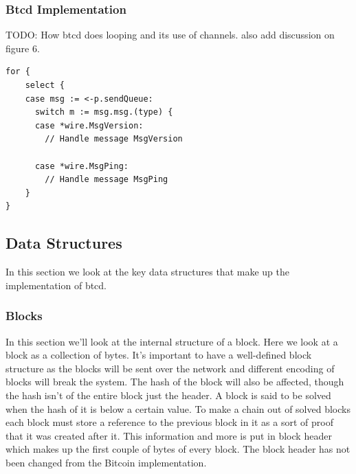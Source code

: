 \documentclass[12pt]{article}
\begin{document}
\subsubsection{Btcd Implementation}

TODO: How btcd does looping and its use of channels. also add discussion on figure 6.

\begin{lstlisting}[float=h!,caption={Block Structure},label=lst:channel_loop]
for {
    select {
    case msg := <-p.sendQueue:
      switch m := msg.msg.(type) {
      case *wire.MsgVersion:
        // Handle message MsgVersion

      case *wire.MsgPing:
        // Handle message MsgPing
    }
}
\end{lstlisting}



\subsection{Data Structures}
In this section we look at the key data structures that make up the implementation of btcd. 

\subsubsection{Blocks}
In this section we'll look at the internal structure of a block. Here we look at a block as a collection of bytes. It's important to have a well-defined block structure as the blocks will be sent over the network and different encoding of blocks will break the system. The hash of the block will also be affected, though the hash isn't of the entire block just the header.
A block is said to be solved when the hash of it is below a certain value. To make a chain out of solved blocks each block must store a reference to the previous block in it as a sort of proof that it was created after it. This information and more is put in block header which makes up the first couple of bytes of every block. The block header has not been changed from the Bitcoin implementation. 
\end{document}
